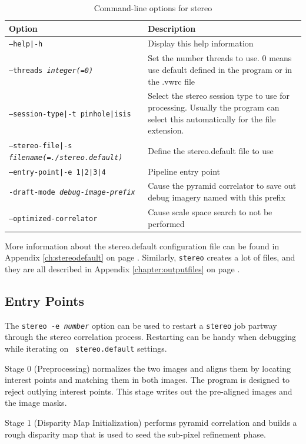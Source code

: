 \begin{longtable}{|l|p{7.5cm}|}
\caption{Command-line options for stereo}
\label{tbl:stereo}
\endfirsthead
\endhead
\endfoot
\endlastfoot
\hline
Option & Description \\ \hline \hline
\texttt{--help|-h} & Display this help information\\ \hline
\texttt{--threads \textit{integer(=0)}} & Set the number threads to use. 0 means use default defined in the program or in the .vwrc file\\ \hline
\texttt{--session-type|-t pinhole|isis} & Select the stereo session type to use for processing. Usually the program can select this automatically for the file extension.\\ \hline
\texttt{--stereo-file|-s \textit{filename(=./stereo.default)}} & Define the stereo.default file to use\\ \hline
\texttt{--entry-point|-e 1|2|3|4} & Pipeline entry point \\ \hline
\texttt{-draft-mode \textit{debug-image-prefix}} & Cause the pyramid correlator to save out debug imagery named with this prefix\\ \hline
\texttt{--optimized-correlator} & Cause scale space search to not be performed\\ \hline
\end{longtable}

More information about the stereo.default configuration file can be found in Appendix \ref{ch:stereodefault} on page \pageref{ch:stereodefault}.  Similarly, \texttt{stereo} creates a lot of files, and they are all described in Appendix \ref{chapter:outputfiles} on page \pageref{chapter:outputfiles}.

\subsection{Entry Points}
\label{entrypoints}

The \texttt{stereo -e \textit{number}} option can be used to restart
a {\tt stereo} job partway through the stereo correlation process.
Restarting can be handy when debugging while iterating on {\tt
stereo.default} settings.

Stage 0 (Preprocessing) normalizes the two images and aligns them
by locating interest points and matching them in both images. The
program is designed to reject outlying interest points.  This stage
writes out the pre-aligned images and the image masks.

Stage 1 (Disparity Map Initialization) performs pyramid correlation and builds a rough disparity map that is used to seed the sub-pixel refinement phase.


